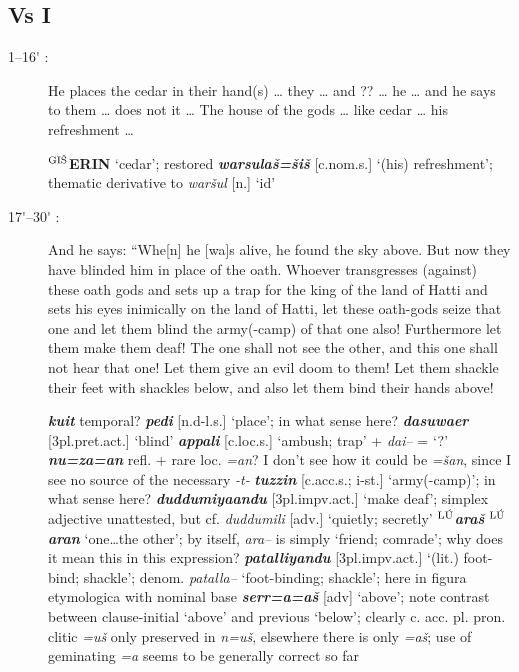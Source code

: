 \documentclass[10pt]{article}
\newcommand{\supersc}[1]{$^{\textrm{\scriptsize{#1}}}$}  	%
\newcommand{\bit}[1]{\textbf{\textit{#1}}}				%
\newcommand{\p}[1]{{\tiny[{#1}]}}					%
\newcommand{\pr}{\'{ }}									%
\newcommand{\hith}{\textsubwedge{h}}
\newcommand{\man}{\supersc{L\'U}}
\newcommand{\wood}{\supersc{GI\v{S}}}
\renewcommand{\.}[1]{\textsubdot{#1}}
\begin{document}
\subsection{Vs I}

\begin{description}

\item[1--16{\pr} :] He places the cedar in their hand(s) {\ldots} they {\ldots} and ?? {\ldots} he {\ldots} and he says to them {\ldots} does not it {\ldots} The house of the gods {\ldots} like cedar {\ldots} his refreshment {\ldots}

\begin{notes}

\textbf{{\wood}ERIN} `cedar'; restored \bit{warsula\v{s}=\v{s}i\v{s}} \p{c.nom.s.} `(his) refreshment'; thematic derivative to \textit{war\v{s}ul} \p{n.} `id'


\end{notes}

\item[17{\pr}--30{\pr} :] And he says: ``Whe[n] he [wa]s alive, he found the sky above. But now they have blinded him in place of the oath. Whoever transgresses (against) these oath gods and sets up a trap for the king of the land of Hatti and sets his eyes inimically on the land of Hatti, let these oath-gods seize that one and let them blind the army(-camp) of that one also! Furthermore let them make them deaf! The one shall not see the other, and this one shall not hear that one! Let them give an evil doom to them! Let them shackle their feet with shackles below, and also let them bind their hands above!

\begin{notes}

\bit{kuit} temporal? \bit{pedi} \p{n.d-l.s.} `place'; in what sense here? \bit{dasuwa{\hith\hith}er} \p{3pl.pret.act.} `blind' \bit{appali} \p{c.loc.s.} `ambush; trap' + \textit{dai--} = `?' \bit{nu=za=an} refl. + rare loc. \textit{=an}? I don't see how it could be \textit{=\v{s}an}, since I see no source of the necessary \textit{-t-} \bit{tuzzin} \p{c.acc.s.; i-st.} `army(-camp)'; in what sense here? \bit{duddumiya{\hith\hith}andu} \p{3pl.impv.act.} `make deaf'; simplex adjective unattested, but cf. \textit{duddumili} \p{adv.} `quietly; secretly' \textbf{\man}\bit{ara\v{s}} \textbf{\man}\bit{aran} `one{\ldots}the other'; by itself, \textit{ara--} is simply `friend; comrade'; why does it mean this in this expression? \bit{patalliyandu} \p{3pl.impv.act.} `(lit.) foot-bind; shackle'; denom. \textit{patalla--} `foot-binding; shackle'; here in figura etymologica with nominal base \bit{serr=a=a\v{s}} \p{adv} `above'; note contrast between clause-initial `above' and previous `below'; clearly c. acc. pl. pron. clitic \textit{=u\v{s}} only preserved in \textit{n=u\v{s}}, elsewhere there is only \textit{=a\v{s}}; use of geminating \textit{=a} seems to be generally correct so far


\end{notes}
\end{description}
\end{document}
